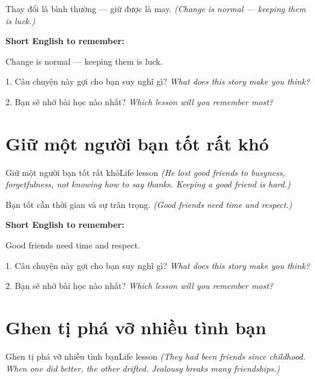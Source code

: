 \begin{baihoc}
Thay đổi là bình thường — giữ được là may.
\textit{(Change is normal — keeping them is luck.)}
\end{baihoc}

\begin{ghinhoanh}
\textbf{Short English to remember:}

Change is normal — keeping them is luck.

\end{ghinhoanh}

\begin{tuhocnhanh}
1. Câu chuyện này gợi cho bạn suy nghĩ gì? \textit{What does this story make you think?}

2. Bạn sẽ nhớ bài học nào nhất? \textit{Which lesson will you remember most?}
\end{tuhocnhanh}
\ngancach


\section{Giữ một người bạn tốt rất khó}
\begin{truyen}{Giữ một người bạn tốt rất khó}{Life lesson}
\textit{(He lost good friends to busyness, forgetfulness, not knowing how to say thanks. Keeping a good friend is hard.)}
\end{truyen}

\begin{baihoc}
Bạn tốt cần thời gian và sự trân trọng.
\textit{(Good friends need time and respect.)}
\end{baihoc}

\begin{ghinhoanh}
\textbf{Short English to remember:}

Good friends need time and respect.

\end{ghinhoanh}

\begin{tuhocnhanh}
1. Câu chuyện này gợi cho bạn suy nghĩ gì? \textit{What does this story make you think?}

2. Bạn sẽ nhớ bài học nào nhất? \textit{Which lesson will you remember most?}
\end{tuhocnhanh}
\ngancach


\section{Ghen tị phá vỡ nhiều tình bạn}
\begin{truyen}{Ghen tị phá vỡ nhiều tình bạn}{Life lesson}
\textit{(They had been friends since childhood. When one did better, the other drifted. Jealousy breaks many friendships.)}
\end{truyen}

